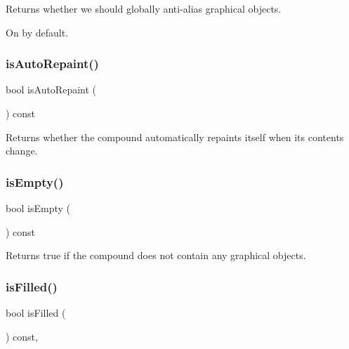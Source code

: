 Returns whether we should globally anti-\/alias graphical objects. 

On by default. \mbox{\label{classsgl_1_1GCompound_a12c8d52ddfcaa5448ec4bace92ddee6c}} 
\subsubsection{\texorpdfstring{is\+Auto\+Repaint()}{isAutoRepaint()}}
{\footnotesize\ttfamily bool is\+Auto\+Repaint (\begin{DoxyParamCaption}{ }\end{DoxyParamCaption}) const\hspace{0.3cm}{\ttfamily [virtual]}}



Returns whether the compound automatically repaints itself when its contents change. 

\mbox{\label{classsgl_1_1GCompound_acf82f9b2937375c7b1cf3dccb3df3312}} 
\subsubsection{\texorpdfstring{is\+Empty()}{isEmpty()}}
{\footnotesize\ttfamily bool is\+Empty (\begin{DoxyParamCaption}{ }\end{DoxyParamCaption}) const\hspace{0.3cm}{\ttfamily [virtual]}}



Returns true if the compound does not contain any graphical objects. 

\mbox{\label{classsgl_1_1GObject_a11c404f106940c201b6f326e0355c150}} 
\subsubsection{\texorpdfstring{is\+Filled()}{isFilled()}}
{\footnotesize\ttfamily bool is\+Filled (\begin{DoxyParamCaption}{ }\end{DoxyParamCaption}) const\hspace{0.3cm}{\ttfamily [virtual]}, {\ttfamily [inherited]}}



